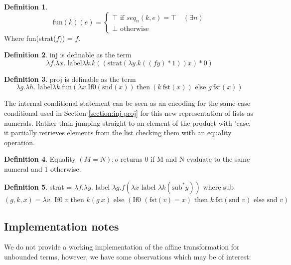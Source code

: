 \documentclass[12pt,a4paper]{report}
\theoremstyle{definition}
\theoremstyle{definition}
\newtheorem{definition}{Definition}[chapter]%
\theoremstyle{remark}
\begin{document}
\begin{definition}
    \[
    \text{fun}(k)(e)=
    \begin{cases}
        \top \text{ if } seq_n(k,e) = \top \quad (\exists n)\\
        \bot \text{ otherwise}
    \end{cases}
    \]
    Where fun(strat($f$)) = $f$.
\end{definition}

\begin{definition}
    inj is definable as the term
    \[
    \lambda f. \lambda x. \text{ label} \lambda k. k((\text{strat}(\lambda y.k((f y) * 1))x)*0)
    \]
\end{definition}

\begin{definition}
    proj is definable as the term
    \[
    \lambda g. \lambda h. \text{ label} \lambda k. \text{fun} (\lambda x.\text{If0}(\text{snd}(x))\ \text{then}\ (k\ \text{fst}(x)) \text{ else } g\ \text{fst}(x))
    \]
\end{definition}

The internal conditional statement can be seen as an encoding for the same case conditional used in Section \ref{section:inj-proj} for this new representation of lists as numerals. Rather than jumping straight to an element of the product with 'case, it partially retrieves elements from the list checking them with an equality operation.

\begin{definition}
    Equality $(M = N):o$ returns 0 if M and N evaluate to the same numeral and 1 otherwise. 
\end{definition}

\begin{definition}
    strat = $\lambda f. \lambda y. \text{ label }\lambda g.f(\lambda x \text{ label } \lambda k (\text{sub}^* y))$ where sub$(g, k, x) = \lambda v. \text{ If0 } v \text{ then } k(g\ x) \text{ else } (\text{If0 } (\text{fst}(v) = x) \text{ then } k\ \text{fst}(\text{snd } v) \text{ else snd } v )$
\end{definition}

\subsection{Implementation notes}
We do not provide a working implementation of the affine transformation for unbounded terms, however, we have some observations which may be of interest:  
\end{document}
